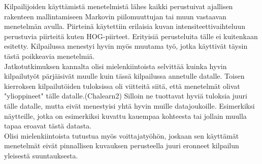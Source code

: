 Kilpailijoiden käyttämistä menetelmistä lähes kaikki perustuivat ajallisen rakenteen mallintamiseen 
Markovin piilomuuttujan tai muun vastaavan menetelmän avulla. Piirteinä käytettiin erilaisia kuvan 
intensiteettivaihteluun perustuvia piirteitä kuten HOG-piirteet. Erityisiä perusteluita tälle ei kuitenkaan esitetty.
Kilpailussa menestyi hyvin myös muutama työ, jotka käyttivät täysin tästä poikkeavia menetelmiä.\\

Jatkotutkimuksen kannalta olisi mielenkiintoista selvittää kuinka hyvin kilpailutyöt pärjäisivät
muulle kuin tässä kilpailussa annetulle datalle. Toisen kierroksen kilpailutöiden tuloksissa oli viitteitä
siitä, että menetelmät olivat "ylioppineet" tälle datalle.(Chalearn2) Silloin ne tuottavat hyviä tuloksia juuri
tälle datalle, mutta eivät menestyisi yhtä hyvin muille datajoukoille. Esimerkiksi näytteille, jotka on esimerkiksi kuvattu kauempaa 
kohteesta tai jollain muulla tapaa eroavat tästä datasta. \\

Olisi mielenkiintoista tutustua myös voittajatyöhön, joskaan sen käyttämät menetelmät eivät pinnallisen
kuvauksen perusteella juuri eronneet kilpailun yleisestä suuntauksesta.












